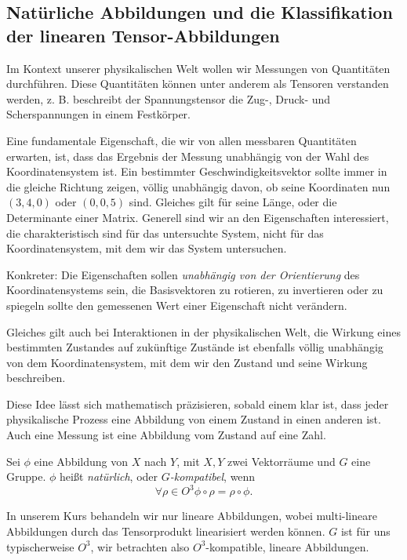 \subsection{Natürliche Abbildungen und die Klassifikation der linearen Tensor-Abbildungen}
Im Kontext unserer physikalischen Welt wollen wir Messungen von Quantitäten durchführen. Diese Quantitäten können unter anderem als Tensoren verstanden werden, z. B. beschreibt der Spannungstensor die Zug-, Druck- und Scherspannungen in einem Festkörper.

Eine fundamentale Eigenschaft, die wir von allen messbaren Quantitäten erwarten, ist, dass das Ergebnis der Messung unabhängig von der Wahl des Koordinatensystem ist. Ein bestimmter Geschwindigkeitsvektor sollte immer in die gleiche Richtung zeigen, völlig unabhängig davon, ob seine Koordinaten nun $(3,4,0)$ oder $(0,0,5)$ sind. Gleiches gilt für seine Länge, oder die Determinante einer Matrix. Generell sind wir an den Eigenschaften interessiert, die charakteristisch sind für das untersuchte System, nicht für das Koordinatensystem, mit dem wir das System untersuchen.

Konkreter: Die Eigenschaften sollen \emph{unabhängig von der Orientierung} des Koordinatensystems sein, die Basisvektoren zu rotieren, zu invertieren oder zu spiegeln sollte den gemessenen Wert einer Eigenschaft nicht verändern.

Gleiches gilt auch bei Interaktionen in der physikalischen Welt, die Wirkung eines bestimmten Zustandes auf zukünftige Zustände ist ebenfalls völlig unabhängig von dem Koordinatensystem, mit dem wir den Zustand und seine Wirkung beschreiben.

Diese Idee lässt sich mathematisch präzisieren, sobald einem klar ist, dass jeder physikalische Prozess eine Abbildung von einem Zustand in einen anderen ist. Auch eine Messung ist eine Abbildung vom Zustand auf eine Zahl.

\begin{definition}
	Sei $\phi$ eine Abbildung von $X$ nach $Y$, mit $X,Y$ zwei Vektorräume und $G$ eine Gruppe. $\phi$ heißt \emph{natürlich}, oder \emph{$G$-kompatibel}, wenn 
	\begin{equation*}
		\forall \rho\in O^3 \phi \circ \rho = \rho \circ \phi.
	\end{equation*}
\end{definition}
In unserem Kurs behandeln wir nur lineare Abbildungen, wobei multi-lineare Abbildungen durch das Tensorprodukt linearisiert werden können. $G$ ist für uns typischerweise $O^3$, wir betrachten also $O^3$-kompatible, lineare Abbildungen.

